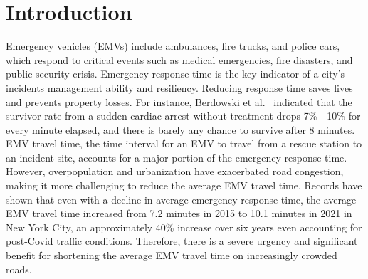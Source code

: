 \section{Introduction}
Emergency vehicles (EMVs) include ambulances, fire trucks, and police cars, which respond to critical events such as medical emergencies, fire disasters, and public security crisis. Emergency response time is the key indicator of a city's incidents management ability and resiliency. Reducing response time saves lives and prevents property losses. For instance, Berdowski et al.~\cite{berdowski2010global} indicated that the survivor rate from a sudden cardiac arrest without treatment drops 7\% - 10\% for every minute elapsed, and there is barely any chance to survive after 8 minutes. EMV travel time, the time interval for an EMV to travel from a rescue station to an incident site, accounts for a major portion of the emergency response time. However, overpopulation and urbanization have exacerbated road congestion, making it more challenging to reduce the average EMV travel time. Records \cite{end-to-end-response-times} have shown that even with a decline in average emergency response time, the average EMV travel time increased from 7.2 minutes in 2015 to 10.1 minutes in 2021 in New York City, an approximately 40\% increase over six years even accounting for post-Covid traffic conditions. Therefore, there is a severe urgency and significant benefit for shortening the average EMV travel time on increasingly crowded roads.
%
